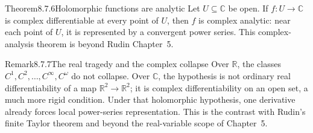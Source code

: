\documentclass[main.tex]{subfiles}
\begin{document}
\begin{Obj}{Theorem}{8.7.6}{Holomorphic functions are analytic}
Let $U\subseteq\mathbb C$ be open. If $f:U\to\mathbb C$ is complex differentiable at every
point of $U$, then $f$ is complex analytic: near each point of $U$, it is represented by a
convergent power series. This complex-analysis theorem is beyond Rudin Chapter~5.
\end{Obj}


\begin{ObjL}{Remark}{8.7.7}{The real tragedy and the complex collapse}
Over $\mathbb R$, the classes $C^1,C^2,\ldots,C^\infty,C^\omega$ do not collapse. Over
$\mathbb C$, the hypothesis is not ordinary real differentiability of a map
$\mathbb R^2\to\mathbb R^2$; it is complex differentiability on an open set, a much more rigid
condition. Under that holomorphic hypothesis, one derivative already forces local power-series
representation. This is the contrast with Rudin's finite Taylor theorem  and beyond the
real-variable scope of Chapter~5.
\end{ObjL}

\ifSubfilesClassLoaded{\clearpage\objindex}{}
\end{document}
